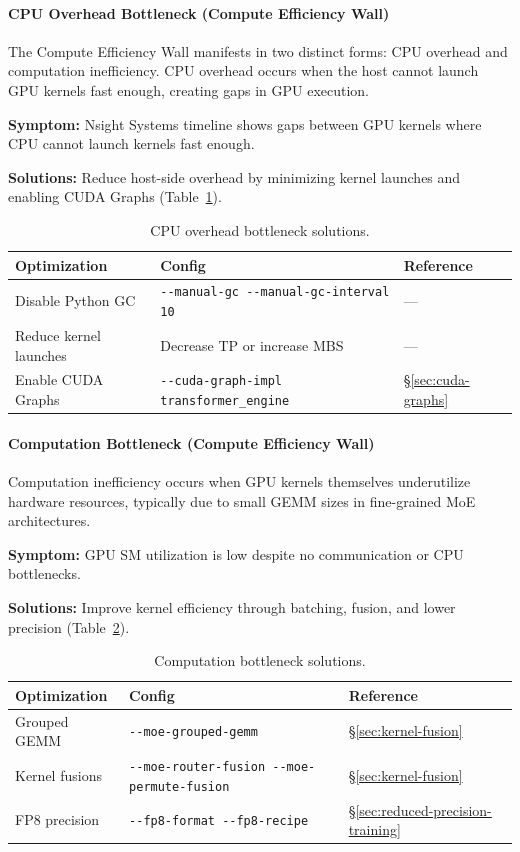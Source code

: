 \documentclass[10pt,logo,copyright]{nvidiatechreport}
\begin{document}
\paragraph*{CPU Overhead Bottleneck (Compute Efficiency Wall)}
The Compute Efficiency Wall manifests in two distinct forms: CPU overhead and computation inefficiency. CPU overhead occurs when the host cannot launch GPU kernels fast enough, creating gaps in GPU execution.

\noindent\textbf{Symptom:} Nsight Systems timeline shows gaps between GPU kernels where CPU cannot launch kernels fast enough.

\noindent\textbf{Solutions:} Reduce host-side overhead by minimizing kernel launches and enabling CUDA Graphs (Table~\ref{tab:cpu-bottleneck}).

\begin{table}[ht]
\centering
\caption{CPU overhead bottleneck solutions.}
\label{tab:cpu-bottleneck}
\begin{tabular}{lll}
\toprule
\textbf{Optimization} & \textbf{Config} & \textbf{Reference} \\
\midrule
Disable Python GC & \texttt{-{}-manual-gc -{}-manual-gc-interval 10} & --- \\
Reduce kernel launches & Decrease TP or increase MBS & --- \\
Enable CUDA Graphs & \texttt{-{}-cuda-graph-impl transformer\_engine} & \S\ref{sec:cuda-graphs} \\
\bottomrule
\end{tabular}
\end{table}

\paragraph*{Computation Bottleneck (Compute Efficiency Wall)}
Computation inefficiency occurs when GPU kernels themselves underutilize hardware resources, typically due to small GEMM sizes in fine-grained MoE architectures.

\noindent\textbf{Symptom:} GPU SM utilization is low despite no communication or CPU bottlenecks.

\noindent\textbf{Solutions:} Improve kernel efficiency through batching, fusion, and lower precision (Table~\ref{tab:compute-bottleneck}).

\begin{table}[ht]
\centering
\caption{Computation bottleneck solutions.}
\label{tab:compute-bottleneck}
\begin{tabular}{llp{4cm}}
\toprule
\textbf{Optimization} & \textbf{Config} & \textbf{Reference} \\
\midrule
Grouped GEMM & \texttt{-{}-moe-grouped-gemm} & \S\ref{sec:kernel-fusion} \\
Kernel fusions & \texttt{-{}-moe-router-fusion -{}-moe-permute-fusion} & \S\ref{sec:kernel-fusion} \\
FP8 precision & \texttt{-{}-fp8-format -{}-fp8-recipe} & \S\ref{sec:reduced-precision-training} \\
\bottomrule
\end{tabular}
\end{table}
\end{document}
